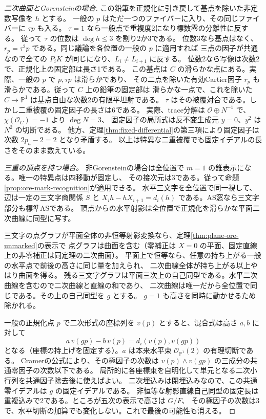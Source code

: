 \begin{proof}[二次曲面とGorensteinの場合]
この鉛筆を正規化に引き戻して基点を除いた非定数写像を $h$ とする。
一般の $p$ はただ一つのファイバーに入り、その同じファイバーに $\tau p$ も入る。
$\tau=1$ なら一般点で重複度2になり標数零の分離性に反する。
従って $\tau$ の位数は $\deg h\le3$ を割り2か3である。
位数3なら基点はなく、$r_p=\tau^2p$ である。同じ議論を各位置の一般の $p$ に適用すれば
三点の因子が共通なので全ての $P_i K$ が同じになり、$L_i\ne L_{i+1}$ に反する。
位数2なら写像は次数2で、正規化上の固定部は長さ1である。
この基点は $C$ の滑らかな点にある。実際、一般の $p$ で $p,\tau p$ は滑らかであり、
その二点を除いた有効Cartier因子 $r_p$ も滑らかである。従って $C$ 上の鉛筆の固定部は
滑らかな一点で、これを除いた $C\to\mathbb P^1$ は基点自由な次数2の有限平坦射である。
$\tau$ はその被覆対合である。しかし二重被覆の固定因子の長さは6である。
実際、trace分解は $\mathcal O\oplus N^{-1}$ で、$\chi(\mathcal O_C)=-1$ より $\deg N=3$、
固定因子の局所式は反不変生成元 $y=0$、$y^2$ は $N^2$ の切断である。
他方、定理\ref{thm:fixed-differential}の第三項により固定因子は次数 $2p_a-2=2$ となり矛盾する。
以上は特異な二重被覆でも固定イデアルの長さをそのまま数えている。

\smallskip
\noindent\textit{三重の頂点を持つ場合。}
非Gorensteinの場合は全位置で $m=1$ の錐表示になる。唯一の特異点は四移動が固定し、
その接次元は3である。従って命題\ref{prop:ore-mark-recognition}が適用できる。
水平三文字を全位置で同一視して、辺は一定の三文字商関係 $S$ と
$X_i h-h X_{i+1}=d_i(h)$ である。AS窓なら三文字部分も標準ASである。
頂点からの水平射影は全位置で正規化を滑らかな平面二次曲線に同型に写す。

三文字の点グラフが平面全体の非恒等射影変換なら、定理\ref{thm:plane-ore-unmarked}の表示で
点グラフは曲面を含む（零補正は $X=0$ の平面、固定直線上の非零補正は同定理の二次曲面）。
平面上で恒等なら、任意の持ち上がる一般の水平点で前後の高さに同じ量を加えられ、
二次曲線全体が持ち上がる以上やはり曲面を得る。
残る三文字グラフは平面三次上の自己同型である。水平二次曲線を含むので二次曲線と直線の和であり、
二次曲線は唯一だから全位置で同じである。その上の自己同型を $g$ とする。
$g=1$ も高さを同時に動かせるため除かれる。

一般の正規化点 $p$ で二次形式の座標列を $v(p)$ とすると、混合式は高さ $a,b$ に対して
\[
               a\,v(gp)-b\,v(p)=d_i(v(p),v(gp))
\]
となる（座標の持上げを固定する）。$a$ は本来水平束 $\mathcal O_{\mathbb P^1}(2)$ の有理切断である。
Cramerの公式により、その極因子の次数は $v(p)\wedge v(gp)$ の三成分の共通零因子の次数以下である。
局所的に各座標束を自明化して単元となる二次小行列を共通因子除去後に使えばよい。
二次埋込みは閉埋込みなので、この共通零イデアルは $g$ の固定イデアルである。
非恒等な射影直線自己同型の固定長は重複込みで2である。ところが五次の表示で高さは $G/F$、
その極因子の次数は3で、水平切断の加算でも変化しない。これで最後の可能性も消える。
\end{proof}

